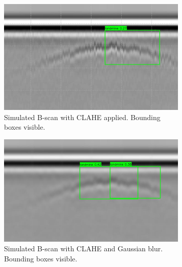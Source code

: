 \begin{figure}[htbp]
            \begin{subfigure}[b]{0.32\textwidth}
                \centering
                \includegraphics[width=\textwidth]{figs/Rory/sim_bscan_clahe_detection_cropped.png}
                \caption{Simulated B-scan with CLAHE applied. Bounding boxes visible.}
                \label{fig:bscan_clahe}
            \end{subfigure}
            \hfill
            \begin{subfigure}[b]{0.32\textwidth}
                \centering
                \includegraphics[width=\textwidth]{figs/Rory/sim_bscan_clahe_detection_blur_cropped.png}
                \caption{Simulated B-scan with CLAHE and Gaussian blur. Bounding boxes visible.}
                \label{fig:bscan_blur}
            \end{subfigure}
            \hfill
            \begin{subfigure}[b]{0.32\textwidth}
                \centering

\end{subfigure}
\end{figure}
